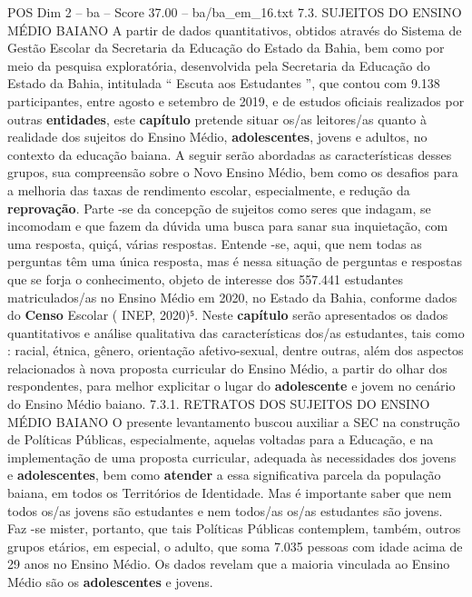 \begin{textsample}{POS Dim 2 – ba – Score 37.00 – ba/ba\_em\_16.txt}  \label{ex:f2_pos_033}
7.3.
SUJEITOS DO ENSINO MÉDIO BAIANO A partir de dados quantitativos, obtidos através do Sistema de Gestão Escolar da Secretaria da Educação do Estado da Bahia, bem como por meio da pesquisa exploratória, desenvolvida pela Secretaria da Educação do Estado da Bahia, intitulada “ Escuta aos Estudantes ”, que contou com 9.138 participantes, entre agosto e setembro de 2019, e de estudos oficiais realizados por outras \textbf{entidades}, este \textbf{capítulo} pretende situar os/as leitores/as quanto à realidade dos sujeitos do Ensino Médio, \textbf{adolescentes}, jovens e adultos, no contexto da educação baiana.
A seguir serão abordadas as características desses grupos, sua compreensão sobre o Novo Ensino Médio, bem como os desafios para a melhoria das taxas de rendimento escolar, especialmente, e redução da \textbf{reprovação}.
Parte -se da concepção de sujeitos como seres que indagam, se incomodam e que fazem da dúvida uma busca para sanar sua inquietação, com uma resposta, quiçá, várias respostas.
Entende -se, aqui, que nem todas as perguntas têm uma única resposta, mas é nessa situação de perguntas e respostas que se forja o conhecimento, objeto de interesse dos 557.441 estudantes matriculados/as no Ensino Médio em 2020, no Estado da Bahia, conforme dados do \textbf{Censo} Escolar ( INEP, 2020)⁵.
Neste \textbf{capítulo} serão apresentados os dados quantitativos e análise qualitativa das características dos/as estudantes, tais como : racial, étnica, gênero, orientação afetivo-sexual, dentre outras, além dos aspectos relacionados à nova proposta curricular do Ensino Médio, a partir do olhar dos respondentes, para melhor explicitar o lugar do \textbf{adolescente} e jovem no cenário do Ensino Médio baiano. 7.3.1.
RETRATOS DOS SUJEITOS DO ENSINO MÉDIO BAIANO O presente levantamento buscou auxiliar a SEC na construção de Políticas Públicas, especialmente, aquelas voltadas para a Educação, e na implementação de uma proposta curricular, adequada às necessidades dos jovens e \textbf{adolescentes}, bem como \textbf{atender} a essa significativa parcela da população baiana, em todos os Territórios de Identidade.
Mas é importante saber que nem todos os/as jovens são estudantes e nem todos/as os/as estudantes são jovens.
Faz -se mister, portanto, que tais Políticas Públicas contemplem, também, outros grupos etários, em especial, o adulto, que soma 7.035 pessoas com idade acima de 29 anos no Ensino Médio.
Os dados revelam que a maioria vinculada ao Ensino Médio são os \textbf{adolescentes} e jovens.

\end{textsample}
